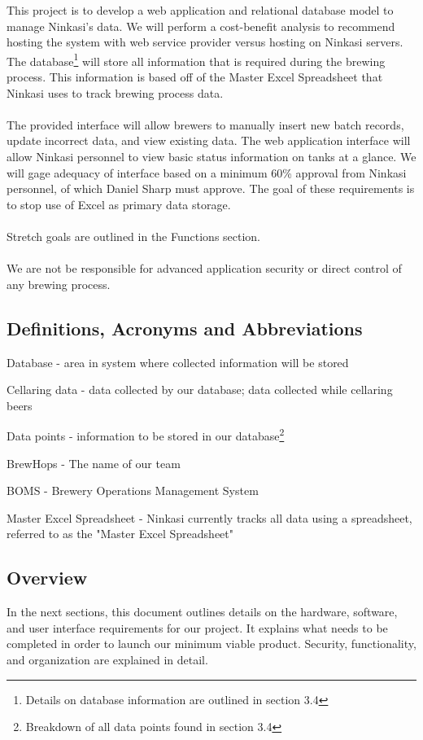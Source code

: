 \documentclass[draftclsnofoot,onecolumn,letterpaper,10pt,compsoc]{IEEEtran}
\begin{document}
		This project is to develop a web application and relational database model to manage Ninkasi's data.
		We will perform a cost-benefit analysis to recommend hosting the system with web service provider versus hosting on Ninkasi servers.
		The database\footnote{Details on database information are outlined in section 3.4} will store all information that is required during the brewing process.
    This information is based off of the Master Excel Spreadsheet that Ninkasi uses to track brewing process data.
    \\
    \\
		The provided interface will allow brewers to manually insert new batch records, update incorrect data, and view existing data.
		The web application interface will allow Ninkasi personnel to view basic status information on tanks at a glance.
		We will gage adequacy of interface based on a minimum 60\% approval from Ninkasi personnel, of which Daniel Sharp must approve.
		The goal of these requirements is to stop use of Excel as primary data storage.
		\\
		\\
		Stretch goals are outlined in the Functions section.
		\\
		\\
		We are not be responsible for advanced application security or direct control of any brewing process.

	\subsection{Definitions, Acronyms and Abbreviations}
        Database - area in system where collected information will be stored

        Cellaring data - data collected by our database; data collected while cellaring beers

		Data points - information to be stored in our database\footnote{Breakdown of all data points found in section 3.4}

		BrewHops - The name of our team

		BOMS - Brewery Operations Management System

        Master Excel Spreadsheet - Ninkasi currently tracks all data using a spreadsheet, referred to as the "Master Excel Spreadsheet"

	\subsection{Overview}
		In the next sections, this document outlines details on the hardware, software, and user interface requirements for our project.
		It explains what needs to be completed in order to launch our minimum viable product.
		Security, functionality, and organization are explained in detail.
\end{document}
